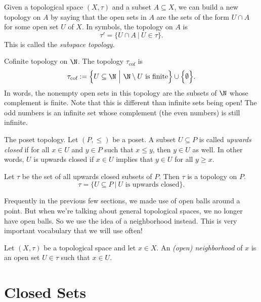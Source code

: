 \documentclass[noname]{notes}
\begin{document}
\begin{example}
	Given a topological space $(X,\tau)$ and a subset $A \subseteq X$, we can build a new topology on $A$ by saying that the open sets in $A$ are the sets of the form $U \cap A$ for some open set $U$ of $X$. In symbols, the topology on $A$ is
	\[
		\tau' = \Big\{U \cap A\ \Big\vert\ U \in \tau\Big\}. 
	\]
	This is called the \emph{subspace topology}. 
\end{example}

\begin{example}
	Cofinite topology on $\N$. The topology $\tau_\text{cof}$ is 
	\[
		\tau_\text{cof} := \Big\{ U \subseteq \N \ \Big\vert\ \N \setminus U \text{ is finite} \Big\} \cup \Big\{\emptyset\Big\}. 
	\]
	In words, the nonempty open sets in this topology are the subsets of $\N$ whose complement is finite. Note that this is different than infinite sets being open! The odd numbers is an infinite set whose complement (the even numbers) is still infinite. 
\end{example}

\begin{example}
	The poset topology. Let $(P, \leq)$ be a poset. A subset $U \subseteq P$ is called \emph{upwards closed} if for all $x \in U$ and $y \in P$ such that $x \leq y$, then $y \in U$ as well. In other words, $U$ is upwards closed if $x \in U$ implies that $y \in U$ for all $y \geq x$. 
	
	Let $\tau$ be the set of all upwards closed subsets of $P$. Then $\tau$ is a topology on $P$. 
	\[
		\tau = \Big\{ U \subseteq P\ \Big\vert\ U \text{ is upwards closed}\Big\}.
	\]
\end{example}

Frequently in the previous few sections, we made use of open balls around a point. But when we're talking about general topological spaces, we no longer have open balls. So we use the idea of a neighborhood instead. This is  very important vocabulary that we will use often!

\begin{definition}
	Let $(X, \tau)$ be a topological space and let $x \in X$. An \emph{(open) neighborhood} of $x$ is an open set $U \in \tau$ such that $x \in U$. 
\end{definition}

\section{Closed Sets}
\end{document}
